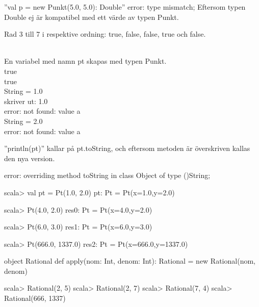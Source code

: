 ''val p = new Punkt(5.0, 5.0): Double'' error: type mismatch;
Eftersom typen Double ej är kompatibel med ett värde av typen Punkt.

\Subtask 
Rad 3 till 7 i respektive ordning: true, false, false, true och false.

\Task %
\\En variabel med namn pt skapas med typen Punkt.\
\\true
\\true
\\String = 1.0
\\skriver ut: 1.0
\\error: not found: value a
\\String = 2.0
\\error: not found: value a

\Task %

\Subtask 
''println(pt)'' kallar på pt.toString, och eftersom metoden är överskriven kallas den nya version.

\Subtask  {}

\Subtask 
error: overriding method toString in class Object of type ()String;

\Task %

\Subtask 
\begin{REPL}
scala> val pt = Pt(1.0, 2.0)
pt: Pt = Pt(x=1.0,y=2.0)

scala> Pt(4.0, 2.0)
res0: Pt = Pt(x=4.0,y=2.0)

scala> Pt(6.0, 3.0)
res1: Pt = Pt(x=6.0,y=3.0)

scala> Pt(666.0, 1337.0)
res2: Pt = Pt(x=666.0,y=1337.0)
\end{REPL}

\Subtask {}

\Subtask {}

\Subtask 
\begin{REPLnonum}
object Rational { 
def apply(nom: Int, denom: Int): Rational = new Rational(nom, denom)
}
\end{REPLnonum}

\Subtask 
\begin{REPL}
scala> Rational(2, 5)
scala> Rational(2, 7)
scala> Rational(7, 4)
scala> Rational(666, 1337)
\end{REPL}

\Task %
\Subtask {}

